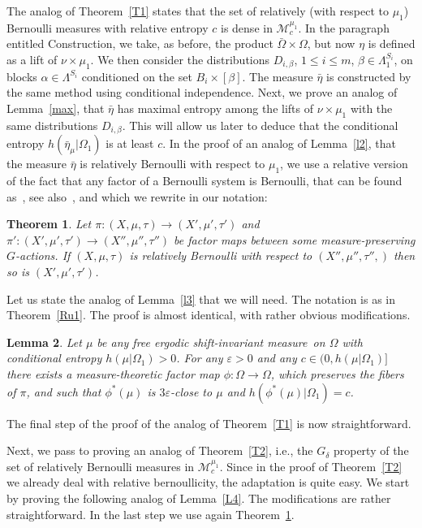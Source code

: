 \documentclass{amsart}
\newtheorem{thm}{Theorem}[section]
\newtheorem{lem}[thm]{Lemma}
\theoremstyle{remark}
\def \M {\mathcal M}
\def \eps {\varepsilon}
\def \im {invariant measure}
\begin{document}
The analog of Theorem~\ref{T1} states that the set of relatively (with respect to $\mu_1$) Bernoulli measures with relative entropy $c$ is dense in $\M^{\mu_1}_c$. In the paragraph entitled Construction, we take, as before, the product $\bar\Omega\times\Omega$, but now $\eta$ is defined as a lift of $\nu\times\mu_1$. We then consider the distributions $D_{i,\beta}$, $1\le i\le m$, $\beta\in\Lambda_1^{S_i}$, on blocks $\alpha\in\Lambda^{S_i}$ conditioned on the set $B_i\times[\beta]$. The measure $\bar\eta$ is constructed by the same method using conditional independence. Next, we  prove an analog of Lemma~\ref{max}, that $\bar\eta$ has maximal entropy among the lifts of $\nu\times\mu_1$ with the same distributions $D_{i,\beta}$. This will allow us later to deduce that the conditional entropy $h(\bar\eta_{\mu}|\Omega_1)$ is at least $c$. In the proof of an analog of Lemma~\ref{l2}, that the measure $\bar\eta$ is relatively Bernoulli with respect to $\mu_1$, we use a relative version of the fact that any factor of a Bernoulli system is Bernoulli, that can be found as~\cite[Proposition~5, p. 198]{10a}, see also~\cite[Theorem~4.9, p. 1731]{3a}, and which we rewrite in our notation:
 
\begin{thm}\label{danpark}Let $\pi:(X,\mu,\tau)\to(X',\mu',\tau')$ and $\pi':(X',\mu',\tau')\to(X'',\mu'',\tau'')$ be factor maps between 
some measure-preserving $G$-actions. If $(X,\mu,\tau)$ is relatively Bernoulli with respect to $(X'',\mu'',\tau'',)$ then so is $(X',\mu',\tau')$.
\end{thm}

Let us state the analog of Lemma~\ref{l3} that we will need. The notation is as in Theorem~\ref{Ru1}. The proof is almost identical, with rather obvious modifications.

\begin{lem}\label{l3n}
Let $\mu$ be any free ergodic shift-\im\ on $\Omega$ with conditional entropy $h(\mu|\Omega_1)>0$. For any $\eps>0$ and any $c\in(0,h(\mu|\Omega_1)]$ there exists a measure-theoretic factor map $\phi:\Omega\to\Omega$, which preserves the fibers of $\pi$, and such that $\phi^*(\mu)$ is $3\eps$-close to $\mu$ and $h(\phi^*(\mu)|\Omega_1)=c$.
\end{lem}

The final step of the proof of the analog of Theorem~\ref{T1} is now straightforward.
\smallskip

Next, we pass to proving an analog of Theorem~\ref{T2}, i.e., the $G_\delta$ property of the set of relatively Bernoulli measures in $\M^{\mu_1}_c$. Since in the proof of Theorem~\ref{T2} we already deal with relative bernoullicity, the adaptation is quite easy. We start by proving the following analog of Lemma~\ref{L4}. The modifications are rather straightforward. In the last step we use again Theorem~\ref{danpark}. 
\end{document}
